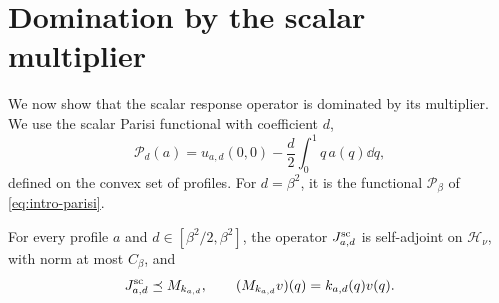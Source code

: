 \section{Domination by the scalar multiplier}\label{sec:sc-domination}

We now show that the scalar response operator is dominated by its
multiplier.
We use the scalar Parisi functional with coefficient $d$,
\[
 \mathcal P_d(a)=u_{a,d}(0,0)-\frac d2\int_0^1q\,a(q)\dd q,
\]
defined on the convex set of profiles. For $d=\beta^2$, it is the
functional $\mathcal P_\beta$ of \eqref{eq:intro-parisi}.

\begin{lemma}\label{lem:Jdom}
For every profile $a$ and $d\in[\beta^2/2,\beta^2]$, the operator
$J^{\mathrm{sc}}_{a,d}$ is self-adjoint on $\mathcal H_\nu$, with norm at most
$C_\beta$, and
\begin{equation}\label{eq:Jdom}
 J^{\mathrm{sc}}_{a,d}\preceq M_{k_{a,d}},
 \qquad (M_{k_{a,d}}v)(q)=k_{a,d}(q)v(q).
\end{equation}
\end{lemma}

